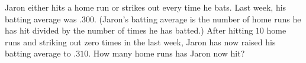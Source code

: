 Jaron either hits a home run or strikes out every time he bats. Last week, his batting average was $.300$. (Jaron's batting average is the number of home runs he has hit divided by the number of times he has batted.) After hitting $10$ home runs and striking out zero times in the last week, Jaron has now raised his batting average to $.310$. How many home runs has Jaron now hit?
